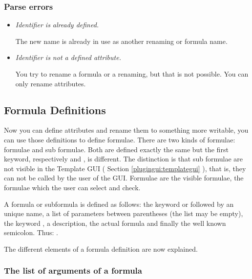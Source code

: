 \subsubsection{Parse errors}

\begin{itemize}

    \item \textit{Identifier is already defined.}
    
    The new name is already in use as another renaming or formula name.

    \item \textit{Identifier is not a defined attribute.}
    
    You try to rename a formula or a renaming, but that is not possible. You can only rename
    attributes. 

\end{itemize}

\subsection{Formula Definitions}
\label{language:formula}

Now you can define attributes and rename them to something more writable, you
can use those definitions to define formulae. There are two kinds of formulae:
formulae and sub formulae. Both are defined exactly the same but the
first keyword, respectively  and , is different. The
distinction is that sub formulae are not visible in the Template GUI ( Section \ref{plugingui:templategui} ), that is, they can not be called by the
user of the GUI. Formulae are the visible formulae, the formulae which the
user can select and check.

A formula or subformula is defined as follows: the keyword  or
 followed by an unique name, a list of parameters between
parentheses (the list may be empty), the keyword \ltl{:=}, a description, the
actual formula and finally the well known semicolon. Thus: .

The different elements of a formula definition are now explained.

\subsubsection{The list of arguments of a formula}

